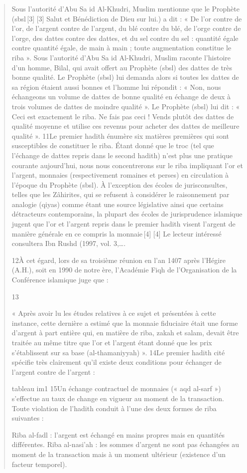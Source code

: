 \begin{quote}
Sous l’autorité d’Abu Sa id Al-Khudri, Muslim mentionne que le Prophète (sbsl [3]
[3]
Salut et Bénédiction de Dieu sur lui.) a dit :
« De l’or contre de l’or, de l’argent contre de l’argent, du blé contre du blé, de l’orge contre de l’orge, des dattes contre des dattes, et du sel contre du sel : quantité égale contre quantité égale, de main à main ; toute augmentation constitue le riba ».
Sous l’autorité d’Abu Sa id Al-Khudri, Muslim raconte l’histoire d’un homme, Bilal, qui avait offert au Prophète (sbsl) des dattes de très bonne qualité. Le Prophète (sbsl) lui demanda alors si toutes les dattes de sa région étaient aussi bonnes et l’homme lui répondit : « Non, nous échangeons un volume de dattes de bonne qualité en échange de deux à trois volumes de dattes de moindre qualité ». Le Prophète (sbsl) lui dit : « Ceci est exactement le riba. Ne fais pas ceci ! Vends plutôt des dattes de qualité moyenne et utilise ces revenus pour acheter des dattes de meilleure qualité ».
11Le premier hadith énumère six matières premières qui sont susceptibles de constituer le riba. Étant donné que le troc (tel que l’échange de dattes repris dans le second hadith) n’est plus une pratique courante aujourd’hui, nous nous concentrerons sur le riba impliquant l’or et l’argent, monnaies (respectivement romaines et perses) en circulation à l’époque du Prophète (sbsl). À l’exception des écoles de jurisconsultes, telles que les Zâhirites, qui se refusent à considérer le raisonnement par analogie (qiyas) comme étant une source législative ainsi que certains détracteurs contemporains, la plupart des écoles de jurisprudence islamique jugent que l’or et l’argent repris dans le premier hadith visent l’argent de manière générale en ce compris la monnaie [4]
[4]
Le lecteur intéressé consultera Ibn Rushd (1997, vol. 3,….

12À cet égard, lors de sa troisième réunion en l’an 1407 après l’Hégire (A.H.), soit en 1990 de notre ère, l’Académie Fiqh de l’Organisation de la Conférence islamique juge que :

13

« Après avoir lu les études relatives à ce sujet et présentées à cette instance, cette dernière a estimé que la monnaie fiduciaire était une forme d’argent à part entière qui, en matière de riba, zakah et salam, devait être traitée au même titre que l’or et l’argent étant donné que les prix s’établissent sur sa base (al-thamaniyyah) ».
14Le premier hadith cité spécifie très clairement qu’il existe deux conditions pour échanger de l’argent contre de l’argent :

tableau im1
15Un échange contractuel de monnaies (« aqd al-sarf ») s’effectue au taux de change en vigueur au moment de la transaction. Toute violation de l’hadith conduit à l’une des deux formes de riba suivantes :

Riba al-fadl : l’argent est échangé en mains propres mais en quantités différentes.
Riba al-nasi’ah : les sommes d’argent ne sont pas échangées au moment de la transaction mais à un moment ultérieur (existence d’un facteur temporel).

\end{quote}

